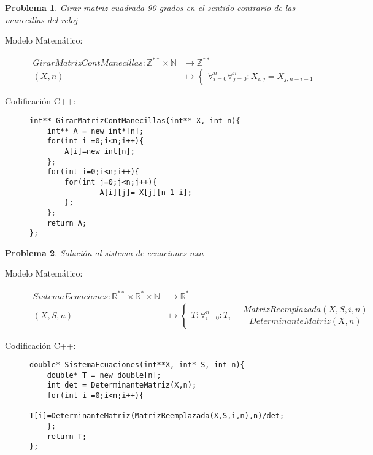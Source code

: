 \documentclass{article}
\theoremstyle{plain}
\theoremstyle{definition}
\newtheorem{problem}{Problema}
\begin{document}
\begin{problem} \emph{Girar matriz cuadrada 90 grados en el sentido contrario de las manecillas del reloj }\\
\begin{description}
\item[Modelo Matemático:]
\begin{align*}
GirarMatrizContManecillas: \mathbb{Z}^{**}\times\mathbb{N} &\to \mathbb{Z}^{**}\\
(X,n) &\mapsto
\begin{cases}
\forall_{i=0}^{n} \forall_{j=0}^{n}: X_{i,j}=X_{j,n-i-1}
\end{cases}
\end{align*}
%
\item[Codificación \textsf{C++}:]\hfill
%
\begin{verbatim}
int** GirarMatrizContManecillas(int** X, int n){
    int** A = new int*[n];
    for(int i =0;i<n;i++){
        A[i]=new int[n];
    };
    for(int i=0;i<n;i++){
        for(int j=0;j<n;j++){
                A[i][j]= X[j][n-1-i];
        };
    };
    return A;
};
\end{verbatim}
\end{description}
\end{problem}

\begin{problem} \emph{Solución al sistema de ecuaciones $n$x$n$ }\\
\begin{description}
\item[Modelo Matemático:]
\begin{align*}
SistemaEcuaciones: \mathbb{R}^{**}\times\mathbb{R}^{*}\times\mathbb{N} &\to \mathbb{R}^{*}\\
(X,S,n) &\mapsto
\begin{cases}
T :\forall_{i=0}^{n}:  T_{i} = \dfrac{MatrizReemplazada(X,S,i,n)}{DeterminanteMatriz(X,n)}
\end{cases}
\end{align*}
%
\item[Codificación \textsf{C++}:]\hfill
%
\begin{verbatim}
double* SistemaEcuaciones(int**X, int* S, int n){
    double* T = new double[n];
    int det = DeterminanteMatriz(X,n);
    for(int i =0;i<n;i++){
        T[i]=DeterminanteMatriz(MatrizReemplazada(X,S,i,n),n)/det;
    };
    return T;
};
\end{verbatim}
\end{description}
\end{problem}
\end{document}
